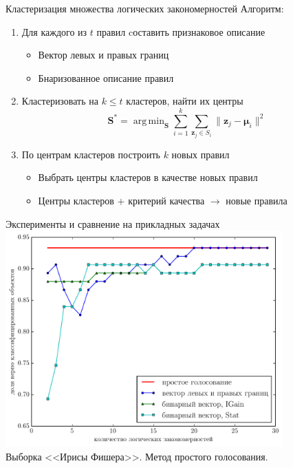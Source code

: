 \documentclass[utf8]{beamer}
\DeclareMathOperator*{\argmin}{arg\,min}
\begin{document}
\begin{frame}{Кластеризация множества логических закономерностей}
  Алгоритм:
  \begin{enumerate}
  \item Для каждого из \(t\) правил cоставить признаковое описание
    \begin{itemize}
    \item Вектор левых и правых границ
    \item Бнаризованное описание правил
    \end{itemize}
  \item Кластеризовать на \(k\leq t\) кластеров, найти их центры
    \begin{equation*}\label{eq:quality}
      \bm{S}^* =
      \argmin_{\bm{S}}
      \sum_{i=1}^k \sum_{\bm{z}_j\in S_i} \|\bm{z}_j - \bm{\mu}_i\|^2
    \end{equation*}
  \item По центрам кластеров построить \(k\) новых правил
    \begin{itemize}
    \item Выбрать центры кластеров в качестве новых правил
    \item Центры кластеров \(+\) критерий качества \(\rightarrow\) новые правила
    \end{itemize}
  \end{enumerate}
\end{frame}

\begin{frame}{Эксперименты и сравнение на прикладных задачах}
  \centering
  \includegraphics[width=0.8\textwidth,keepaspectratio]{iris}
  \\ Выборка <<Ирисы Фишера>>. Метод простого голосования.
\end{frame}
\end{document}
